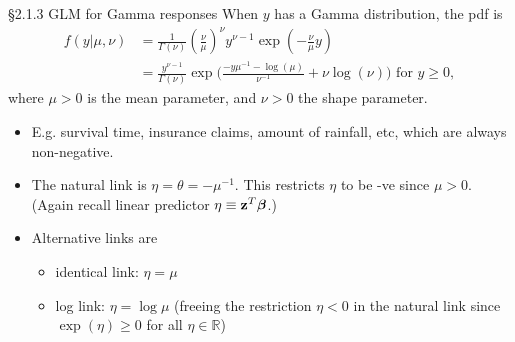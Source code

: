 \documentclass{beamer}
\begin{document}
\begin{frame}{\large \S2.1.3 GLM for Gamma responses}
When $y$ has a Gamma distribution, the pdf is
\begin{align*}
f(y|\mu,\nu)&=\frac{1}{\Gamma(\nu)}\left(\frac{\nu}{\mu}\right)^\nu y^{\nu-1}\exp\left(-\frac{\nu}{\mu}y\right)\\
&= \frac{y^{\nu-1}}{\Gamma(\nu)} \exp \Bigg( \frac{ - y \mu^{-1}- \log(\mu)}{\nu^{-1}} + \nu \log (\nu ) \Bigg) \text{ for } y \geq 0,
\end{align*}
where $\mu>0$ is the mean parameter, and $\nu>0$ the shape parameter.
\begin{itemize}
\item E.g. survival time, insurance claims, amount of rainfall, etc, which are always non-negative.
\item
The natural link is $\eta=\theta= - \mu^{-1}$.  This restricts $\eta$ to be -ve since $\mu >0$. (Again recall linear predictor $\eta\equiv \textbf{z}^T\mbox{\boldmath $\beta$}$.)
\item
Alternative links are

\begin{itemize}

\item identical link: $\eta=\mu$
\item log link:  $\eta=\log \mu$  (freeing the restriction $\eta < 0$ in the natural link since $\exp(\eta) \geq 0$ for all $\eta \in \mathbb{R}$)
\end{itemize}
\end{itemize}
\end{frame}

\end{document}
